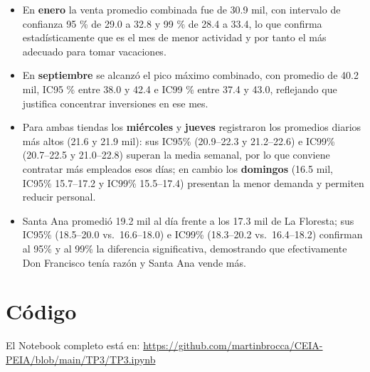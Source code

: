 \documentclass[12pt,a4paper]{article}
\begin{document}
\begin{itemize}
  \item En \textbf{enero} la venta promedio combinada fue de 30.9 mil, con intervalo de confianza 95 \% de 29.0 a 32.8 y 99 \% de 28.4 a 33.4, lo que confirma estadísticamente que es el mes de menor actividad y por tanto el más adecuado para tomar vacaciones.
  \item En \textbf{septiembre} se alcanzó el pico máximo combinado, con promedio de 40.2 mil, IC95 \% entre 38.0 y 42.4 e IC99 \% entre 37.4 y 43.0, reflejando que justifica concentrar inversiones en ese mes.
  \item Para ambas tiendas los \textbf{miércoles} y \textbf{jueves} registraron los promedios diarios más altos (21.6 y 21.9 mil): sus IC95\% (20.9–22.3 y 21.2–22.6) e IC99\% (20.7–22.5 y 21.0–22.8) superan la media semanal, por lo que conviene contratar más empleados esos días; en cambio los \textbf{domingos} (16.5 mil, IC95\% 15.7–17.2 y IC99\% 15.5–17.4) presentan la menor demanda y permiten reducir personal.
  \item Santa Ana promedió 19.2 mil al día frente a los 17.3 mil de La Floresta; sus IC95\% (18.5–20.0 vs.\ 16.6–18.0) e IC99\% (18.3–20.2 vs.\ 16.4–18.2) confirman al 95\% y al 99\% la diferencia significativa, demostrando que efectivamente Don Francisco tenía razón y Santa Ana vende más.
\end{itemize}

\section*{Código}
El Notebook completo está en:\newline
\url{https://github.com/martinbrocca/CEIA-PEIA/blob/main/TP3/TP3.ipynb}
\end{document}
